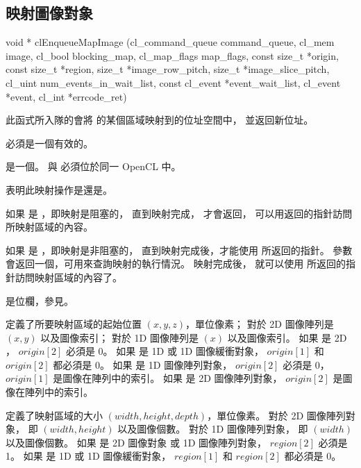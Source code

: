 \subsection{映射圖像對象}


\startCLFUNC
void * clEnqueueMapImage (cl_command_queue command_queue,
			cl_mem image,
			cl_bool blocking_map,
			cl_map_flags map_flags,
			const size_t *origin,
			const size_t *region,
			size_t *image_row_pitch,
			size_t *image_slice_pitch,
			cl_uint num_events_in_wait_list,
			const cl_event *event_wait_list,
			cl_event *event,
			cl_int *errcode_ret)
\stopCLFUNC

此函式所入隊的會將  的某個區域映射到的位址空間中，
並返回新位址。

 必須是一個有效的。

 是一個。
 與  必須位於同一 OpenCL 中。

 表明此映射操作是{}還是{}。

如果  是 ，即映射是阻塞的，
直到映射完成，  才會返回，
可以用返回的指針訪問所映射區域的內容。

如果  是 ，即映射是非阻塞的，
直到映射完成後，才能使用  所返回的指針。
參數  會返回一個，可用來查詢映射的執行情況。
映射完成後，
就可以使用  所返回的指針訪問映射區域的內容了。

 是位欄，參見。

 定義了所要映射區域的起始位置 $(x, y, z)$，單位像素；
對於 2D 圖像陣列是 $(x, y)$ 以及圖像索引；
對於 1D 圖像陣列是 $(x)$ 以及圖像索引。
如果  是 2D ， $origin[2]$ 必須是 0。
如果  是 1D 或 1D 圖像緩衝對象，
$origin[1]$ 和 $origin[2]$ 都必須是 0。
如果  是 1D 圖像陣列對象， $origin[2]$ 必須是 0，
$origin[1]$ 是圖像在陣列中的索引。
如果  是 2D 圖像陣列對象， $origin[2]$ 是圖像在陣列中的索引。

 定義了映射區域的大小 $(width, height, depth)$，單位像素。
對於 2D 圖像陣列對象， 即 $(width, height)$ 以及圖像個數。
對於 1D 圖像陣列對象， 即 $(width)$ 以及圖像個數。
如果  是 2D 圖像對象 或 1D 圖像陣列對象， $region[2]$ 必須是 1。
如果  是 1D 或 1D 圖像緩衝對象，
$region[1]$ 和 $region[2]$ 都必須是 0。

